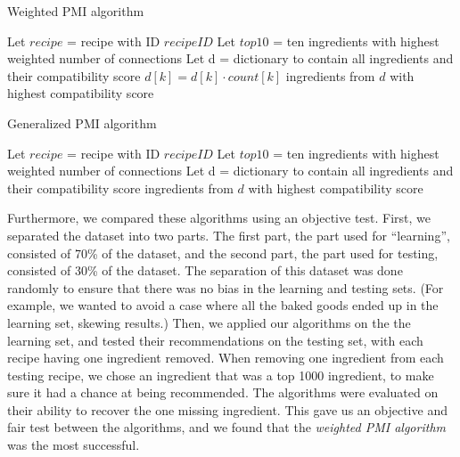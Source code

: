 \documentclass{acm_proc_article-sp}
\begin{document}
  \begin{algorithm}
   \caption{Weighted PMI algorithm}
    \begin{algorithmic}
      	\State Let $recipe$ = recipe with ID $recipeID$
        \State Let $top10$ = ten ingredients with highest weighted number of connections
        \State Let d = dictionary to contain all ingredients and their compatibility score
        		\EndFor
        	\EndIf
        \EndFor
        	$d[k] = d[k] \cdot count[k]$
        \EndFor
         ingredients from $d$ with highest compatibility score
       \EndFunction

\end{algorithmic}
\end{algorithm}

  \begin{algorithm}
   \caption{Generalized PMI algorithm}
    \begin{algorithmic}
      	\State Let $recipe$ = recipe with ID $recipeID$
        \State Let $top10$ = ten ingredients with highest weighted number of connections
        \State Let d = dictionary to contain all ingredients and their compatibility score
    		\EndFor
        \EndFor
         ingredients from $d$ with highest compatibility score
       \EndFunction

\end{algorithmic}
\end{algorithm}

Furthermore, we compared these algorithms using an objective test. First, we separated the dataset into two parts. The first part, the part used for ``learning'', consisted of 70\% of the dataset, and the second part, the part used for testing, consisted of 30\% of the dataset. The separation of this dataset was done randomly to ensure that there was no bias in the learning and testing sets. (For example, we wanted to avoid a case where all the baked goods ended up in the learning set, skewing results.) Then, we applied our algorithms on the the learning set, and tested their recommendations on the testing set, with each recipe having one ingredient removed. When removing one ingredient from each testing recipe, we chose an ingredient that was a top 1000 ingredient, to make sure it had a chance at being recommended. The algorithms were evaluated on their ability to recover the one missing ingredient. This gave us an objective and fair test between the algorithms, and we found that the \textit{weighted PMI algorithm} was the most successful. 
\end{document}
